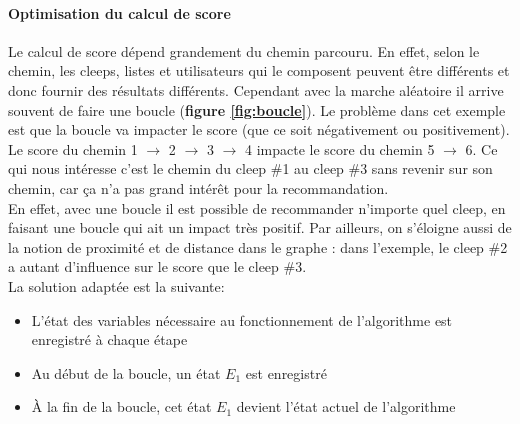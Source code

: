 \documentclass{article} %
\begin{document}
{\paragraph{Optimisation du calcul de score\\}
Le calcul de score dépend grandement du chemin parcouru. En effet, selon le chemin, les cleeps, listes et utilisateurs qui le composent peuvent être différents et donc fournir des résultats différents. Cependant avec la marche aléatoire il arrive souvent de faire une boucle (\textbf{figure \ref{fig:boucle}}). Le problème dans cet exemple est que la boucle va impacter le score (que ce soit négativement ou positivement). Le score du chemin 1 $\rightarrow$ 2 $\rightarrow$ 3 $\rightarrow$ 4 impacte le score du chemin 5 $\rightarrow$ 6. Ce qui nous intéresse c'est le chemin du cleep \#1 au cleep \#3 sans revenir sur son chemin, car ça n'a pas grand intérêt pour la recommandation.\\
En effet, avec une boucle il est possible de recommander n'importe quel cleep, en faisant une boucle qui ait un impact très positif. Par ailleurs, on s'éloigne aussi de la notion de proximité et de distance dans le graphe : dans l'exemple, le cleep \#2 a autant d'influence sur le score que le cleep \#3.\\
La solution adaptée est la suivante:
\begin{itemize}
 \item L'état des variables nécessaire au fonctionnement de l'algorithme est enregistré à chaque étape
 \item Au début de la boucle, un état $E_{1}$ est enregistré
 \item À la fin de la boucle, cet état $E_{1}$ devient l'état actuel de l'algorithme
\end{itemize}

}
\end{document}
